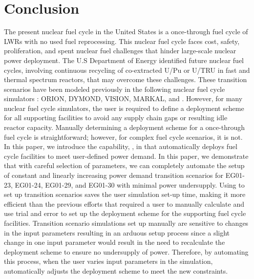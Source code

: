 \section{Conclusion}
The present nuclear fuel cycle in the United States is a once-through 
fuel cycle of LWRs with no used fuel reprocessing. 
This nuclear fuel cycle faces cost, safety, proliferation, and spent 
nuclear fuel challenges that hinder large-scale nuclear power deployment. 
The U.S Department of Energy identified future 
nuclear fuel cycles, involving continuous recycling of co-extracted U/Pu or 
U/TRU in fast and thermal spectrum reactors, that may overcome these challenges.
These transition scenarios have been modeled previously in the following 
nuclear fuel cycle simulators \cite{feng_standardized_2016,bae_standardized_2019}: 
ORION, DYMOND, VISION, MARKAL, and \Cyclus. 
However, for many nuclear fuel cycle simulators, the user is required to 
define a deployment scheme for all supporting facilities to avoid any 
supply chain gaps or resulting idle reactor capacity. 
Manually determining a deployment scheme for a once-through 
fuel cycle is straightforward; however, for complex fuel cycle 
scenarios, it is not. 
In this paper, we introduce the capability, \deploy, in \Cyclus 
that automatically deploys 
fuel cycle facilities to meet user-defined power demand.     
In this paper, we demonstrate that with careful selection of 
\deploy parameters, we can 
completely automate the setup of constant and 
linearly increasing power demand transition scenarios
for EG01-23, EG01-24, EG01-29, and EG01-30 with minimal 
power undersupply. 
Using \deploy to set up transition scenarios 
saves the user simulation set-up time, making it more efficient 
than the previous efforts that
required a user to manually calculate and use trial and error 
to set up the deployment scheme for the supporting fuel cycle 
facilities. 
Transition scenario simulations set up manually are sensitive 
to changes in the input parameters resulting in an 
arduous setup process since a slight change in one 
input parameter would result in the need to recalculate 
the deployment scheme to ensure no undersupply 
of power.   
Therefore, by automating this process, when the user varies input parameters 
in the simulation, \deploy automatically adjusts the
deployment scheme to meet the new constraints. 